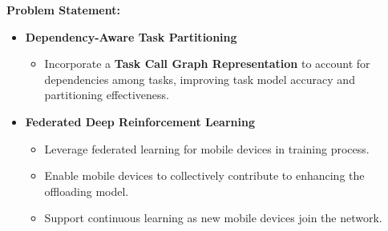 \documentclass[12pt]{article}
\begin{document}
%
%


\vspace{3mm}

\noindent\textbf{\large Problem Statement: }


\vspace{0mm}
	\begin{itemize}
	\item \textbf{Dependency-Aware Task Partitioning}\vspace{-2mm}
	\begin{itemize}
		\item Incorporate a \textbf{Task Call Graph Representation} to account for dependencies among tasks, improving task model accuracy and partitioning effectiveness.
	\end{itemize}
\vspace{-3mm}
	\item \textbf{Federated Deep Reinforcement Learning}\vspace{-2mm}
	\begin{itemize}
		\item Leverage federated learning for mobile devices in training process. \vspace{-2mm}
		\item Enable mobile devices to collectively contribute to enhancing the offloading model.\vspace{-2mm}
		\item Support continuous learning as new mobile devices join the network.\vspace{-2mm}
	\end{itemize}
\end{itemize}
\end{document}
